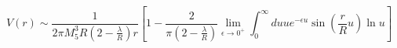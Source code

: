\begin{equation}
\label{rev6}
V(r) \sim \frac{1}{2\pi M_5^3 R \left( 2 - \frac{\lambda}{R} \right) r}
\left[ 1 - \frac{2}{\pi \left(2 - \frac{\lambda}{R} \right)}
\lim_{\epsilon \rightarrow 0^+}
\int_0^{\infty} du u e^{-\epsilon u} \sin \left( \frac{r}{R} u \right)
\ln u \right]
\end{equation}

